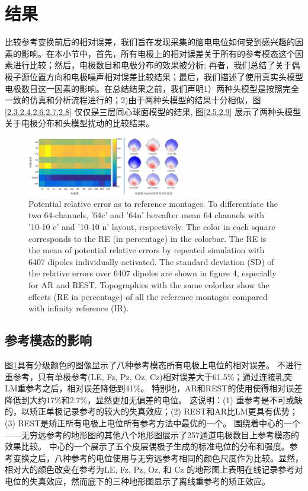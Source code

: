 \section{结果}
比较参考变换前后的相对误差，我们旨在发现采集的脑电电位如何受到感兴趣的因素的影响。在本小节中，首先，所有电极上的相对误差关于所有的参考模态这个因素进行比较；然后，电极数目和电极分布的效果被分析; 再者，我们总结了关于偶极子源位置方向和电极噪声相对误差比较结果；最后，我们描述了使用真实头模型电极数目这一因素的影响。在总结结果之前，我们声明1）两种头模型是按照完全一致的仿真和分析流程进行的；2)由于两种头模型的结果十分相似，图\ref{2.3,2.4,2.6,2.7,2.8} 仅仅是三层同心球面模型的结果, 图\ref{2.5,2.9}  展示了两种头模型关于电极分布和头模型扰动的比较结果。
\begin{figure}[h!]
	\centering
	\includegraphics[width=0.6\textwidth,natwidth=610,natheight=642]{pic/JNE/figure3.png}
	\caption{Potential relative error as to reference montages. To differentiate the two 64-channels, '64c' and '64n' hereafter mean 64 channels with '10-10 c' and '10-10 n' layout, respectively. The color in each square corresponds to the RE (in percentage) in the colorbar. The RE is the mean of potential relative errors by repeated simulation with 6407 dipoles individually activated. The standard deviation (SD) of the relative errors over 6407 dipoles are shown in figure 4, especially for AR and REST. Topographies with the same colorbar show the effects (RE in percentage) of all the reference montages compared with infinity reference (IR).}
	\label{2.3}
\end{figure}
\subsection{参考模态的影响}
图\ref{2.3}具有分级颜色的图像显示了八种参考模态所有电极上电位的相对误差。 不进行重参考，只有单极参考(LE, Fz, Pz, Oz, Cz)相对误差大于61.5\%；通过连接乳突LM重参考之后，相对误差降低到41\%。 特别地，AR和REST的使用使得相对误差降低到大约17\%和2.7\%，显然更加无偏差的电位。 这说明：(1) 重参考是不可或缺的，以矫正单极记录参考的较大的失真效应；(2) REST和AR比LM更具有优势；(3) REST是矫正所有电极上电位所有参考方法中最优的一个。 围绕着中心的一个——无穷远参考的地形图的其他八个地形图展示了257通道电极数目上参考模态的效果比较。 中心的一个展示了五个皮层偶极子生成的标准电位的分布和强度。参考变换之后，八种参考的电位使用与无穷远参考相同的颜色尺度作为比较。显然，相对大的颜色改变在参考为LE, Fz, Pz, Oz, 和 Cz 的地形图上表明在线记录参考对电位的失真效应，然而底下的三种地形图显示了离线重参考的矫正效应。
